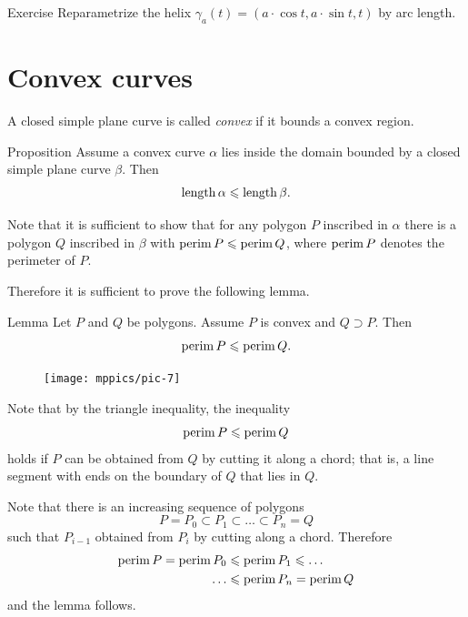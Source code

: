\begin{thm}{Exercise}\label{ex:arc-length-helix}
Reparametrize the helix 
$\gamma_a(t)=(a\cdot\cos t,a\cdot \sin t,t)$
by arc length.
\end{thm}



\section*{Convex curves}

A closed simple plane curve is called \emph{convex} if it bounds a convex region.

\begin{thm}{Proposition}\label{prop:convex-curve}
Assume a convex curve $\alpha$ lies inside the domain bounded by a closed simple plane curve $\beta$.
Then
\[\mathop{\rm length}\nolimits\alpha\leqslant \mathop{\rm length}\nolimits\beta.\]
\end{thm}

Note that it is sufficient to show that for any polygon  $P$ inscribed in $\alpha$ there is a polygon $Q$ inscribed in $\beta$ with 
$\mathop{\rm perim}\nolimits P\leqslant \mathop{\rm perim}\nolimits Q$, where $\mathop{\rm perim}\nolimits P$ denotes the perimeter of $P$.

Therefore it is sufficient to prove the following lemma.


\begin{thm}{Lemma}\label{lem:perimeter}
Let $P$ and $Q$ be polygons.
Assume $P$ is convex and $Q\supset P$.
Then 
\[\mathop{\rm perim}\nolimits P\leqslant \mathop{\rm perim}\nolimits Q.\]

\end{thm}


\begin{figure}
\vskip-4mm
\centering
\texttt{[image: mppics/pic-7]}
\end{figure}

Note that by the triangle inequality,
the inequality
\[\mathop{\rm perim}\nolimits P\leqslant \mathop{\rm perim}\nolimits Q\]
holds
if $P$ can be obtained from $Q$ by cutting it along a chord;
that is, a line segment with ends on the boundary of $Q$ that lies in $Q$.


Note that there is an increasing sequence of polygons 
$$P=P_0\subset P_1\subset\dots\subset P_n=Q$$
such that $P_{i-1}$ obtained from $P_{i}$ by cutting along a chord.
Therefore 
\begin{align*}
\mathop{\rm perim}\nolimits P=\mathop{\rm perim}\nolimits P_0&\leqslant\mathop{\rm perim}\nolimits P_1\leqslant\dots
\\
\dots&\leqslant\mathop{\rm perim}\nolimits P_n=\mathop{\rm perim}\nolimits Q
\end{align*}
and the lemma follows.
\qeds

